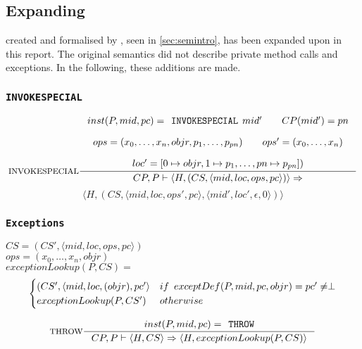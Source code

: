 \subsection{Expanding \jcl}
\jcl created and formalised by \cite{javasec}, seen in \cref{sec:semintro}, has been expanded upon in this report. The original semantics did not describe private method calls and exceptions. In the following, these additions are made.

\subsubsection{\texttt{INVOKESPECIAL}}
$$\inference[INVOKESPECIAL]{
inst(P,mid,pc) = \texttt{INVOKESPECIAL }mid' \semsp 
CP(mid') = pn \semnl \\
ops = (x_0, \ldots, x_n, objr, p_1, \ldots, p_{pn}) \semsp
ops' = (x_0, \ldots, x_{n}) \semnl\\
loc' = [0 \mapsto objr, 1 \mapsto p_{1}, \ldots, pn \mapsto p_{pn}])}
{CP, P \vdash \langle H, (CS, \langle mid, loc, ops, pc \rangle)\rangle \Rightarrow }$$
$$\langle H, (CS, \langle mid, loc, ops', pc \rangle, \langle mid', loc', \epsilon, 0 \rangle)\rangle$$


\subsubsection{\texttt{Exceptions}}
$CS = (CS', \langle mid, loc, ops, pc \rangle)$ \\ 
$ops = (x_0, \ldots, x_n, objr)$\vspace{5px} \\
$exceptionLookup(P, CS) = $ \vspace{-10px} \\
\[
\begin{cases}
  (CS', \langle mid, loc, (objr), pc' \rangle  & if \hspace{5px} exceptDef(P, mid, pc, objr) = pc' \neq \perp\\
  exceptionLookup(P, CS') & otherwise
\end{cases}
\]

$$\inference[THROW]{
inst(P,mid,pc) = \texttt{THROW} }
{CP, P \vdash \langle H, CS \rangle \Rightarrow \langle H, exceptionLookup(P,CS)\rangle}$$
